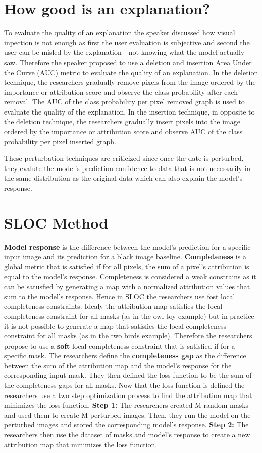 \documentclass[10pt,a4paper]{article}
\begin{document}
\section*{How good is an explanation?}
To evaluate the quality of an explanation the speaker discussed how visual inpection is not enough as first the user evaluation is subjective and second the user can be misled by the explanation - not knowing what the model actually saw.
Therefore the speaker proposed to use a deletion and insertion Area Under the Curve (AUC) metric to evaluate the quality of an explanation.
In the deletion technique, the researchers gradually remove pixels from the image ordered by the importance or attribution score and observe the class probability after each removal.
The AUC of the class probability per pixel removed graph is used to evaluate the quality of the explanation.
In the insertion technique, in opposite to the deletion technique, the researchers gradually insert pixels into the image ordered by the importance or attribution score and observe AUC of the class probability per pixel inserted graph.

These perturbation techniques are criticized since once the date is perturbed, they evalute the model's prediction confidence to data that is not necessarily in the same distribution as the original data which can also explain the model's response.

\section*{SLOC Method}
\textbf{Model response} is the difference between the model's prediction for a specific input image and its prediction for a black image baseline.
\textbf{Completeness} is a global metric that is satisfied if for all pixels, the sum of a pixel's attribution is equal to the model's response.
Completeness is considered a weak constrains as it can be satusfied by generating a map with a normalized attribution values that sum to the model's response.
Hence in SLOC the researchers use fost local completeness constraints.
Idealy the attribution map satisfies the local completeness constraint for all masks (as in the owl toy example) but in practice it is not possible to generate a map that satisfies the local completeness constraint for all masks (as in the two birds example).
Therefore the researchers propose to use a \textbf{soft} local completeness constraint that is satisfied if for a specific mask.
The researchers define the \textbf{completeness gap} as the difference between the sum of the attribution map and the model's response for the corresponding input mask. They then defined the loss function to be the sum of the completeness gaps for all masks.
Now that the loss function is defined the researchers use a two step optimization process to find the attribution map that minimizes the loss function.
\textbf{Step 1:} The researchers created M random masks and used them to create M perturbed images. Then, they run the model on the perturbed images and stored the corresponding model's response.
\textbf{Step 2:} The researchers then use the dataset of masks and model's response to create a new attribution map that minimizes the loss function.
\end{document}
